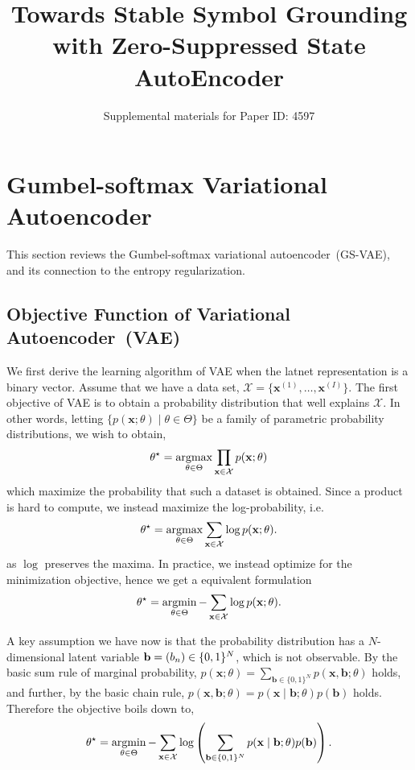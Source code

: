 \documentclass[10pt,letterpaper]{article}
\author{Supplemental materials for Paper ID: 4597}
\title{Towards Stable Symbol Grounding\\ with Zero-Suppressed State AutoEncoder}
\newcommand{\argmin}{\mathop{\rm argmin}}
\newcommand{\argmax}{\mathop{\rm argmax}}
\begin{document}
\maketitle

\section{Gumbel-softmax Variational Autoencoder}
\label{gumbel-softmax-theory}
This section reviews the Gumbel-softmax variational autoencoder~(GS-VAE), and its connection to the entropy regularization.

\subsection{Objective Function of Variational Autoencoder~(VAE)}
We first derive the learning algorithm of VAE when the latnet representation is a binary vector.
Assume that we have a data set, $\mathcal{X}=\{\mathbf{x}^{(1)},\dots,\mathbf{x}^{(I)}\}$.
The first objective of VAE is to obtain a probability distribution that well explains $\mathcal{X}$.
In other words, letting $\{p(\mathbf{x};\theta) \mid \theta\in\Theta\}$ be a family of parametric probability distributions, we wish to obtain,
\begin{align*}
\theta^\star = \argmax_{\theta\in\Theta} \prod_{\mathbf{x}\in \mathcal{X}} p(\mathbf{x};\theta)
\end{align*}
which maximize the probability that such a dataset is obtained. Since a product is hard to compute, we instead maximize the log-probability, i.e.
\begin{align*}
\theta^\star = \argmax_{\theta\in\Theta} \sum_{\mathbf{x}\in \mathcal{X}} \log p(\mathbf{x};\theta).
\end{align*}
as $\log$ preserves the maxima.
In practice, we instead optimize for the minimization objective, hence we get a equivalent formulation
\begin{align*}
\theta^\star = \argmin_{\theta\in\Theta} - \sum_{\mathbf{x}\in \mathcal{X}} \log p(\mathbf{x};\theta).
\end{align*}


A key assumption we have now is that the probability distribution has a $N$-dimensional latent variable $\mathbf{b}={\left(b_n\right)}\in\{0,1\}^N$, which is not observable.
By the basic sum rule of marginal probability,
$p(\mathbf{x};\theta) = \sum_{\mathbf{b}\in\{0,1\}^N}p(\mathbf{x}, \mathbf{b};\theta)$ holds, and further,
by the basic chain rule,
$p(\mathbf{x}, \mathbf{b};\theta) = p(\mathbf{x} \mid \mathbf{b};\theta)p(\mathbf{b})$ holds.
Therefore the objective boils down to,
\begin{align}
\label{eq:vae-obj} \theta^\star = \argmin_{\theta\in\Theta} -\sum_{\mathbf{x}\in \mathcal{X}} \log \left(\sum_{\mathbf{b}\in\{0,1\}^N}p(\mathbf{x} \mid \mathbf{b};\theta)p(\mathbf{b})\right).
\end{align}
\end{document}
